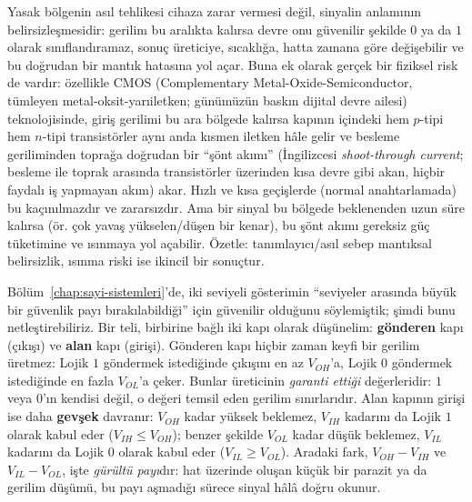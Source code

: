\begin{detaybilgi}
Yasak bölgenin asıl tehlikesi cihaza zarar vermesi değil, sinyalin anlamının
belirsizleşmesidir: gerilim bu aralıkta kalırsa devre onu güvenilir şekilde $0$ ya da $1$
olarak sınıflandıramaz, sonuç üreticiye, sıcaklığa, hatta zamana göre değişebilir ve bu
doğrudan bir mantık hatasına yol açar. Buna ek olarak gerçek bir fiziksel risk de vardır:
özellikle CMOS (Complementary Metal-Oxide-Semiconductor, tümleyen metal-oksit-yarıiletken;
günümüzün baskın dijital devre ailesi) teknolojisinde, giriş gerilimi bu ara bölgede kalırsa
kapının içindeki hem $p$-tipi hem $n$-tipi transistörler aynı anda kısmen iletken hâle gelir
ve besleme geriliminden toprağa doğrudan bir ``şönt akımı'' (İngilizcesi \emph{shoot-through
current}; besleme ile toprak arasında transistörler üzerinden kısa devre gibi akan, hiçbir
faydalı iş yapmayan akım) akar. Hızlı ve kısa geçişlerde (normal anahtarlamada) bu
kaçınılmazdır ve zararsızdır. Ama bir sinyal bu bölgede beklenenden uzun süre kalırsa (ör. çok
yavaş yükselen/düşen bir kenar), bu şönt akımı gereksiz güç tüketimine ve ısınmaya yol
açabilir. Özetle: tanımlayıcı/asıl sebep mantıksal belirsizlik, ısınma riski ise ikincil bir
sonuçtur.
\end{detaybilgi}

\begin{detaybilgi}
\label{detay:gurultu-payi}
Bölüm~\ref{chap:sayi-sistemleri}'de, iki seviyeli gösterimin ``seviyeler arasında büyük bir
güvenlik payı bırakılabildiği'' için güvenilir olduğunu söylemiştik; şimdi bunu
netleştirebiliriz. Bir teli, birbirine bağlı iki kapı olarak düşünelim: \textbf{gönderen}
kapı (çıkışı) ve \textbf{alan} kapı (girişi). Gönderen kapı hiçbir zaman keyfi bir gerilim
üretmez: Lojik $1$ göndermek istediğinde çıkışını en az $V_{OH}$'a, Lojik $0$ göndermek
istediğinde en fazla $V_{OL}$'a çeker. Bunlar üreticinin \emph{garanti ettiği}
değerleridir: $1$ veya $0$'ın kendisi değil, o değeri temsil eden gerilim sınırlarıdır. Alan
kapının girişi ise daha \textbf{gevşek} davranır: $V_{OH}$ kadar yüksek beklemez, $V_{IH}$
kadarını da Lojik $1$ olarak kabul eder ($V_{IH}\le V_{OH}$); benzer şekilde $V_{OL}$ kadar
düşük beklemez, $V_{IL}$ kadarını da Lojik $0$ olarak kabul eder ($V_{IL}\ge V_{OL}$).
Aradaki fark, $V_{OH}-V_{IH}$ ve $V_{IL}-V_{OL}$, işte \emph{gürültü payı}dır: hat üzerinde
oluşan küçük bir parazit ya da gerilim düşümü, bu payı aşmadığı sürece sinyal hâlâ doğru
okunur.
\end{detaybilgi}

